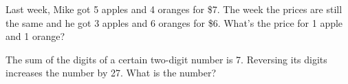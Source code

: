 \vfill
\begin{center}
	\hfill
\end{center}


\newpage


\begin{exercise} Last week, Mike got 5 apples and 4 oranges for \$7. The week the prices are still the same and he got 3 apples and 6 oranges for \$6. What's the price for 1 apple and 1 orange? 
\end{exercise}


\vfill
\begin{center}
\hfill
{}
\end{center}


\begin{exercise} The sum of the digits of a certain two-digit number is 7. Reversing its digits increases the number by 27.
	What is the number?
\end{exercise}


\vfill
\begin{center}
\hfill
\raisebox{0.5em}{
	\rotatebox{\rotationdegree}{
		\parbox{\textwidth}{
			\begin{enumerate*}[resume*=linsys]
				\item 25
				\hfill\null
			\end{enumerate*}
		}
	}
}
\end{center}

